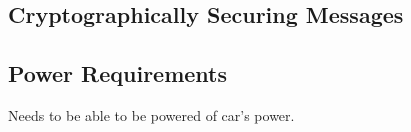 \documentclass[12pt,letterpaper]{article}
\begin{document}
\subsection{Cryptographically Securing Messages}

\subsection{Power Requirements}
Needs to be able to be powered of car's power.
\end{document}
